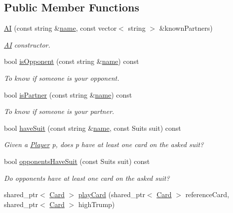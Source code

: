 \subsection*{\-Public \-Member \-Functions}
\begin{DoxyCompactItemize}
\item 
\hyperlink{classAI_a059fcf3ea09f908bca75567937f7e8a7}{\-A\-I} (const string \&\hyperlink{classPlayer_acf0355128a99ee20ad9931b760fb2de1}{name}, const vector$<$ string $>$ \&known\-Partners)
\begin{DoxyCompactList}\small\item\em \hyperlink{classAI}{\-A\-I} constructor. \end{DoxyCompactList}\item 
bool \hyperlink{classAI_aec78eb8010bdcd99c899aaa7af79d9ea}{is\-Opponent} (const string \&\hyperlink{classPlayer_acf0355128a99ee20ad9931b760fb2de1}{name}) const 
\begin{DoxyCompactList}\small\item\em \-To know if someone is your opponent. \end{DoxyCompactList}\item 
bool \hyperlink{classAI_a0cd8c8e4a646c6c1ae51c7812eb1194e}{is\-Partner} (const string \&\hyperlink{classPlayer_acf0355128a99ee20ad9931b760fb2de1}{name}) const 
\begin{DoxyCompactList}\small\item\em \-To know if someone is your partner. \end{DoxyCompactList}\item 
bool \hyperlink{classAI_a01cd7c1760412dde024605226591328c}{have\-Suit} (const string \&\hyperlink{classPlayer_acf0355128a99ee20ad9931b760fb2de1}{name}, const \-Suits suit) const 
\begin{DoxyCompactList}\small\item\em \-Given a \hyperlink{classPlayer}{\-Player} p, does p have at least one card on the asked suit? \end{DoxyCompactList}\item 
bool \hyperlink{classAI_affad35d086fe81539b07a5626b19c1bb}{opponents\-Have\-Suit} (const \-Suits suit) const 
\begin{DoxyCompactList}\small\item\em \-Do opponents have at least one card on the asked suit? \end{DoxyCompactList}\item 
shared\-\_\-ptr$<$ \hyperlink{classCard}{\-Card} $>$ \hyperlink{classAI_a3f5b2888e03634db701c66f82a4f03a8}{play\-Card} (shared\-\_\-ptr$<$ \hyperlink{classCard}{\-Card} $>$ reference\-Card, shared\-\_\-ptr$<$ \hyperlink{classCard}{\-Card} $>$ high\-Trump)

\end{DoxyCompactItemize}
